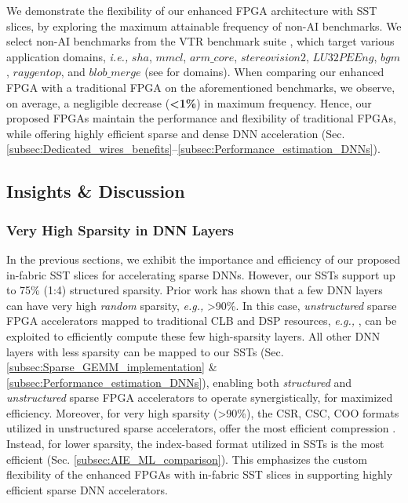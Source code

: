 We demonstrate the flexibility of our enhanced FPGA architecture with SST slices, by 
exploring the maximum attainable frequency of non-AI benchmarks.
We select non-AI benchmarks from the VTR benchmark suite \cite{VTR_8_2020}, which target various application domains, \emph{i.e.,} $sha$, $mmcl$, $arm\_core$, $stereovision2$, $LU32PEEng$, $bgm$, $raygentop$, and $blob\_merge$  (see \cite{VTR_benchmarks} for domains).
When comparing our enhanced FPGA with a traditional FPGA on the aforementioned benchmarks, we observe, on average, a negligible decrease (\textbf{<1\%}) in maximum frequency. 
Hence, our proposed FPGAs maintain the performance and flexibility of traditional FPGAs, while offering highly efficient sparse and dense DNN acceleration (Sec. \ref{subsec:Dedicated_wires_benefits}--\ref{subsec:Performance_estimation_DNNs}).



\subsection{Insights \& Discussion  }
\label{subsec:Discussion_insights}


\subsubsection{Very High Sparsity in DNN Layers} In the previous sections, we exhibit the importance and efficiency of our proposed in-fabric SST slices for accelerating sparse DNNs.
However, our SSTs support up to 75\% (1:4) structured sparsity.
Prior work \cite{EIE_ISCA_2016, Song_Han_learning_2015} has shown that a few DNN layers can have very high \textit{random} sparsity, \emph{e.g.,} >90\%. 
In this case, \textit{unstructured} sparse FPGA accelerators mapped to traditional CLB and DSP resources, \emph{e.g.,}
\cite{Fowers_sparse_FCCM_2014, Abhishek_sparsity_FPL_2020, unstructured_sparsity_CNN_FPGA_FCCM_2019}, can be exploited to efficiently compute these few high-sparsity layers.
All other DNN layers with less sparsity can be mapped to our SSTs (Sec. \ref{subsec:Sparse_GEMM_implementation} \& \ref{subsec:Performance_estimation_DNNs}), enabling both \textit{structured} and \textit{unstructured} sparse FPGA accelerators to operate synergistically, for maximized efficiency.
Moreover, for very high sparsity (>90\%), the CSR, CSC, COO formats utilized in unstructured sparse accelerators, offer the most efficient compression \cite{Sparsity_Hoefler_2021}.
Instead, for lower sparsity, the index-based format utilized in SSTs is the most efficient (Sec. \ref{subsec:AIE_ML_comparison}).
This emphasizes the custom flexibility of the enhanced FPGAs with in-fabric SST slices in supporting highly efficient sparse DNN accelerators.




